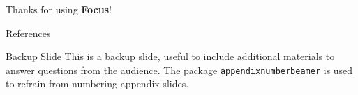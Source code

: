 \documentclass[aspectratio=169]{beamer}
\begin{document}

\begin{frame}[focus]
	Thanks for using \textbf{Focus}!
\end{frame}


\appendix

\begin{frame}{References}
	\nocite{*} %
	
	
\end{frame}


\begin{frame}{Backup Slide}
	This is a backup slide, useful to include additional materials to answer questions from the audience.
	\vfill
	The package \texttt{appendixnumberbeamer} is used to refrain from numbering appendix slides.
\end{frame}

\end{document}
